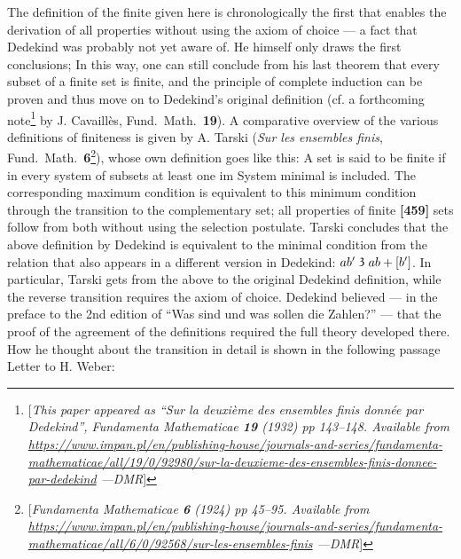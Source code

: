 \documentclass[leqno,hidelinks,a4paper]{article}
\theoremstyle{definition}
\newcommand\partof{\mathrel{\raisebox{0.45ex}{$\mathfrak{3}$}}}
\begin{document}
The definition of the finite given here is chronologically the first that enables the derivation of all properties without using the axiom of choice --- a fact that Dedekind was probably not yet aware of.
He himself only draws the first conclusions; In this way, one can still conclude from his last theorem that every subset of a finite set is finite, and the principle of complete induction can be proven and thus move on to Dedekind's original definition (cf. a forthcoming note\footnote{[\emph{This paper appeared as ``Sur la deuxi\`eme des ensembles finis donn\'ee par Dedekind'', Fundamenta Mathematicae \textbf{19} (1932) pp 143--148. Available from \url{https://www.impan.pl/en/publishing-house/journals-and-series/fundamenta-mathematicae/all/19/0/92980/sur-la-deuxieme-des-ensembles-finis-donnee-par-dedekind} ---DMR}]} by J. Cavaillès, Fund.\ Math.\ \textbf{19}).
A comparative overview of the various definitions of finiteness is given by A. Tarski (\emph{Sur les ensembles finis}, Fund.\ Math.\ \textbf{6}\footnote{[\emph{Fundamenta Mathematicae \textbf{6} (1924) pp 45--95. Available from \url{https://www.impan.pl/en/publishing-house/journals-and-series/fundamenta-mathematicae/all/6/0/92568/sur-les-ensembles-finis} ---DMR}]}), whose own definition goes like this: A set is said to be finite if in every system of subsets at least one im System minimal is included.
The corresponding maximum condition is equivalent to this minimum condition through the transition to the complementary set; all properties of finite \textbf{[459]}
sets follow from both without using the selection postulate.
Tarski concludes that the above definition by Dedekind is equivalent to the minimal condition from the relation that also appears in a different version in Dedekind: $ab' \partof ab+[b']$.
In particular, Tarski gets from the above to the original Dedekind definition, while the reverse transition requires the axiom of choice.
Dedekind believed --- in the preface to the 2nd edition of ``Was sind und was sollen die Zahlen?'' --- that the proof of the agreement of the definitions required the full theory developed there.
How he thought about the transition in detail is shown in the following passage Letter to H. Weber:
\end{document}
